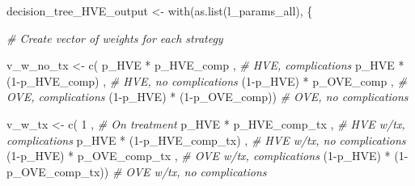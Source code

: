 \documentclass[
]{article}
\newenvironment{Shaded}{\begin{snugshade}}{\end{snugshade}}
\newcommand{\CommentTok}[1]{\textcolor[rgb]{0.56,0.35,0.01}{\textit{#1}}}
\newcommand{\DecValTok}[1]{\textcolor[rgb]{0.00,0.00,0.81}{#1}}
\newcommand{\FunctionTok}[1]{\textcolor[rgb]{0.00,0.00,0.00}{#1}}
\newcommand{\NormalTok}[1]{#1}
\newcommand{\OtherTok}[1]{\textcolor[rgb]{0.56,0.35,0.01}{#1}}
\newcommand{\SpecialCharTok}[1]{\textcolor[rgb]{0.00,0.00,0.00}{#1}}
\begin{document}
\begin{Shaded}
\begin{Highlighting}[]
\NormalTok{decision\_tree\_HVE\_output }\OtherTok{\textless{}{-}} \FunctionTok{with}\NormalTok{(}\FunctionTok{as.list}\NormalTok{(l\_params\_all), \{}
  
  \CommentTok{\# Create vector of weights for each strategy }
  
\NormalTok{  v\_w\_no\_tx  }\OtherTok{\textless{}{-}} \FunctionTok{c}\NormalTok{(  p\_HVE  }\SpecialCharTok{*}\NormalTok{    p\_HVE\_comp  ,  }\CommentTok{\# HVE, complications}
\NormalTok{                    p\_HVE  }\SpecialCharTok{*}\NormalTok{ (}\DecValTok{1}\SpecialCharTok{{-}}\NormalTok{p\_HVE\_comp) ,  }\CommentTok{\# HVE, no complications}
\NormalTok{                 (}\DecValTok{1}\SpecialCharTok{{-}}\NormalTok{p\_HVE) }\SpecialCharTok{*}\NormalTok{    p\_OVE\_comp  ,  }\CommentTok{\# OVE, complications}
\NormalTok{                 (}\DecValTok{1}\SpecialCharTok{{-}}\NormalTok{p\_HVE) }\SpecialCharTok{*}\NormalTok{ (}\DecValTok{1}\SpecialCharTok{{-}}\NormalTok{p\_OVE\_comp))   }\CommentTok{\# OVE, no complications}
  
\NormalTok{  v\_w\_tx     }\OtherTok{\textless{}{-}} \FunctionTok{c}\NormalTok{(  }\DecValTok{1}\NormalTok{                          ,  }\CommentTok{\# On treatment}
\NormalTok{                    p\_HVE  }\SpecialCharTok{*}\NormalTok{    p\_HVE\_comp\_tx  ,  }\CommentTok{\# HVE w/tx, complications}
\NormalTok{                    p\_HVE  }\SpecialCharTok{*}\NormalTok{ (}\DecValTok{1}\SpecialCharTok{{-}}\NormalTok{p\_HVE\_comp\_tx) ,  }\CommentTok{\# HVE w/tx, no complications}
\NormalTok{                 (}\DecValTok{1}\SpecialCharTok{{-}}\NormalTok{p\_HVE) }\SpecialCharTok{*}\NormalTok{    p\_OVE\_comp\_tx  ,  }\CommentTok{\# OVE w/tx, complications}
\NormalTok{                 (}\DecValTok{1}\SpecialCharTok{{-}}\NormalTok{p\_HVE) }\SpecialCharTok{*}\NormalTok{ (}\DecValTok{1}\SpecialCharTok{{-}}\NormalTok{p\_OVE\_comp\_tx))   }\CommentTok{\# OVE w/tx, no complications}
  

\end{Highlighting}
\end{Shaded}
\end{document}

